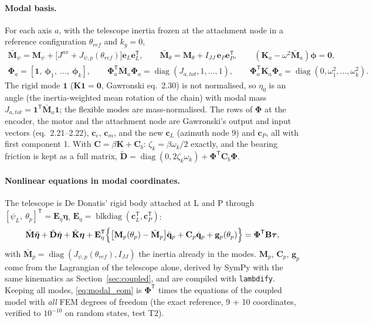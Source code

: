 \documentclass[10pt,a4paper]{article}
\numberwithin{equation}{section}
\begin{document}
\paragraph{Modal basis.} For each axis $a$, with the telescope inertia frozen at the attachment node in a reference configuration $\theta_{ref}$ and $k_g = 0$,
\begin{gather}
\bar{\mathbf M}_\psi = \mathbf M_\psi + \bigl[J^{ax} + J_{\psi,p}(\theta_{ref})\bigr]\mathbf e_L\mathbf e_L^{\mathsf T},\qquad \bar{\mathbf M}_\theta = \mathbf M_\theta + I_{JJ}\,\mathbf e_P\mathbf e_P^{\mathsf T},\qquad (\mathbf K_a - \omega^2\bar{\mathbf M}_a)\boldsymbol\phi = \mathbf 0,\label{eq:modal_eig}\\
\boldsymbol\Phi_a = [\mathbf 1,\ \boldsymbol\phi_1,\ \dots,\ \boldsymbol\phi_k],\qquad \boldsymbol\Phi_a^{\mathsf T}\bar{\mathbf M}_a\boldsymbol\Phi_a = \operatorname{diag}(J_{a,tot}, 1, \dots, 1),\qquad \boldsymbol\Phi_a^{\mathsf T}\mathbf K_a\boldsymbol\Phi_a = \operatorname{diag}(0, \omega_1^2, \dots, \omega_k^2).
\end{gather}
The rigid mode $\mathbf 1$ ($\mathbf K\mathbf 1 = \mathbf 0$, Gawronski eq.~2.30) is not normalised, so $\eta_0$ is an angle (the inertia-weighted mean rotation of the chain) with modal mass $J_{a,tot} = \mathbf 1^{\mathsf T}\bar{\mathbf M}_a\mathbf 1$; the flexible modes are mass-normalised. The rows of $\boldsymbol\Phi$ at the encoder, the motor and the attachment node are Gawronski's output and input vectors (eq.~2.21--2.22), $\mathbf c_e$, $\mathbf c_m$, and the new $\mathbf c_L$ (azimuth node 9) and $\mathbf c_P$, all with first component 1. With $\mathbf C = \beta\mathbf K + \mathbf C_b$: $\zeta_k = \beta\omega_k/2$ exactly, and the bearing friction is kept as a full matrix, $\tilde{\mathbf D} = \operatorname{diag}(0, 2\zeta_k\omega_k) + \boldsymbol\Phi^{\mathsf T}\mathbf C_b\boldsymbol\Phi$.
\paragraph{Nonlinear equations in modal coordinates.} The telescope is De Donatis' rigid body attached at L and P through $[\psi_L,\ \theta_p]^{\mathsf T} = \mathbf E_\eta\boldsymbol\eta$, $\mathbf E_\eta = \operatorname{blkdiag}(\mathbf c_L^{\mathsf T}, \mathbf c_P^{\mathsf T})$:
\begin{gather}
\tilde{\mathbf M}\ddot{\boldsymbol\eta} + \tilde{\mathbf D}\dot{\boldsymbol\eta} + \tilde{\mathbf K}\boldsymbol\eta + \mathbf E_\eta^{\mathsf T}\Bigl\{\bigl[\mathbf M_p(\theta_p) - \bar{\mathbf M}_p\bigr]\ddot{\mathbf q}_p + \mathbf C_p\dot{\mathbf q}_p + \mathbf g_p(\theta_p)\Bigr\} = \boldsymbol\Phi^{\mathsf T}\mathbf B\boldsymbol\tau,\label{eq:modal_eom}
\end{gather}
with $\bar{\mathbf M}_p = \operatorname{diag}(J_{\psi,p}(\theta_{ref}), I_{JJ})$ the inertia already in the modes. $\mathbf M_p$, $\mathbf C_p$, $\mathbf g_p$ come from the Lagrangian of the telescope alone, derived by SymPy with the same kinematics as Section~\ref{sec:coupled}, and are compiled with \texttt{lambdify}. Keeping all modes, \eqref{eq:modal_eom} is $\boldsymbol\Phi^{\mathsf T}$ times the equations of the coupled model with \emph{all} FEM degrees of freedom (the exact reference, 9 + 10 coordinates, verified to $10^{-10}$ on random states, test T2).
\end{document}
